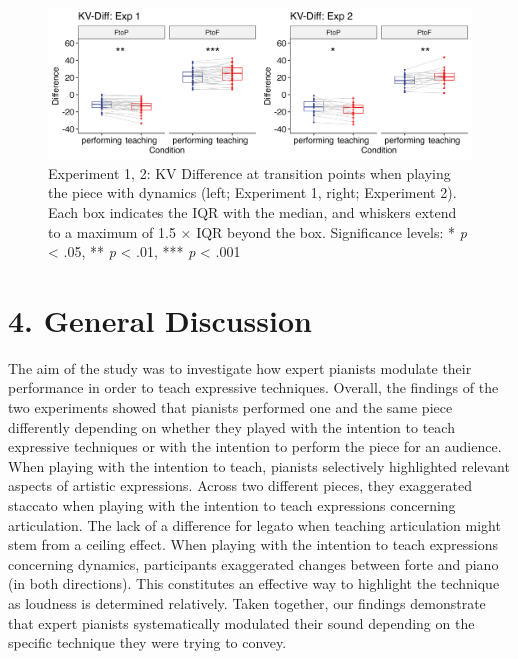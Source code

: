 \documentclass[
  english,
  man,floatsintext]{apa6}
\begin{document}
\begin{figure}
\includegraphics[width=1\linewidth]{manuscript_files/figure-latex/plot-vel-diff-1} \caption{\label{fig:vel-diff}Experiment 1, 2: KV Difference at transition points when playing the piece with dynamics (left; Experiment 1, right; Experiment 2). Each box indicates the IQR with the median, and whiskers extend to a maximum of 1.5 × IQR beyond the box. Significance levels: * \textit{p} < .05, ** \textit{p} < .01, *** \textit{p} < .001}\label{fig:plot-vel-diff}
\end{figure}

\newpage

\hypertarget{general-discussion}{%
\section{4. General Discussion}\label{general-discussion}}

The aim of the study was to investigate how expert pianists modulate their performance in order to teach expressive techniques. Overall, the findings of the two experiments showed that pianists performed one and the same piece differently depending on whether they played with the intention to teach expressive techniques or with the intention to perform the piece for an audience. When playing with the intention to teach, pianists selectively highlighted relevant aspects of artistic expressions. Across two different pieces, they exaggerated staccato when playing with the intention to teach expressions concerning articulation. The lack of a difference for legato when teaching articulation might stem from a ceiling effect. When playing with the intention to teach expressions concerning dynamics, participants exaggerated changes between forte and piano (in both directions). This constitutes an effective way to highlight the technique as loudness is determined relatively. Taken together, our findings demonstrate that expert pianists systematically modulated their sound depending on the specific technique they were trying to convey.
\end{document}
